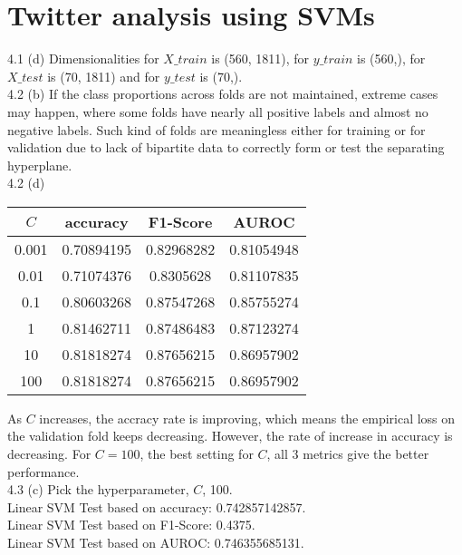 \documentclass[11pt]{article}
\begin{document}
\section{Twitter analysis using SVMs}
4.1 (d) Dimensionalities for $X\_train$ is (560, 1811), for $y\_train$ is (560,), for $X\_test$ is (70, 1811) and for $y\_test$ is (70,).\\

4.2 (b) If the class proportions across folds are not maintained, extreme cases may happen, where some folds have nearly all positive labels and almost no negative labels. Such kind of folds are meaningless either for training or for validation due to lack of bipartite data to correctly form or test the separating hyperplane.\\

4.2 (d)
\begin{center}
    \begin{tabular}{||c c c c||} 
    \hline
    $C$ & accuracy & F1-Score & AUROC\\ [0.5ex] 
    \hline\hline
    0.001 & 0.70894195 & 0.82968282 & 0.81054948\\
    \hline
    0.01 & 0.71074376 & 0.8305628 & 0.81107835\\
    \hline
    0.1 & 0.80603268 & 0.87547268 & 0.85755274\\
    \hline
    1 & 0.81462711 & 0.87486483 & 0.87123274\\
    \hline
    10 & 0.81818274 & 0.87656215 & 0.86957902\\
    \hline
    100 & 0.81818274 & 0.87656215 & 0.86957902\\ [1ex]
    \hline
   \end{tabular}
\end{center}

As $C$ increases, the accracy rate is improving, which means the empirical loss on the validation fold keeps decreasing. However, the rate of increase in accuracy is decreasing. For $C = 100$, the best setting for $C$, all 3 metrics give the better performance. \\

4.3 (c)
Pick the hyperparameter, $C$, 100.\\
Linear SVM Test based on accuracy: 0.742857142857.\\
Linear SVM Test based on F1-Score: 0.4375.\\
Linear SVM Test based on AUROC: 0.746355685131.


\newpage
\end{document}
